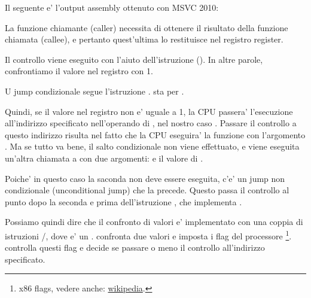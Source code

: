 
Il seguente e' l'output assembly ottenuto con MSVC 2010:



La funzione chiamante (\gls{caller}) \main necessita di ottenere il risultato della funzione chiamata (\gls{callee}), 
e pertanto quest'ultima lo restituisce nel registro \EAX register.

Il controllo viene eseguito con l'aiuto dell'istruzione  (). In altre parole, confrontiamo il valore nel registro \EAX con 1.

U jump condizionale \JNE segue l'istruzione \CMP. \JNE sta per .

Quindi, se il valore nel registro \EAX non e' uguale a 1, la \ac{CPU} passera' l'esecuzione all'indirizzo specificato nell'operando di \JNE, nel nostro caso .
Passare il controllo a questo indirizzo risulta nel fatto che la \ac{CPU} eseguira' la funzione \printf con l'argomento .
Ma se tutto va bene, il salto condizionale non viene effettuato, e viene eseguita un'altra chiamata a \printf con due argomenti:  e il valore di .

Poiche' in questo caso la saconda \printf non deve essere eseguita, c'e' un jump non condizionale (unconditional jump) \JMP che la precede. 
Questo passa il controllo al punto dopo la seconda \printf e prima dell'istruzione , che implementa .

Possiamo quindi dire che il confronto di valori e'  implementato con una coppia di istruzioni \CMP/\Jcc, dove  e' un .
\CMP confronta due valori e imposta i flag del processore \footnote{x86 flags, vedere anche: \href{http://go.yurichev.com/17120}{wikipedia}.}.
\Jcc controlla questi flag e decide se passare o meno il controllo all'indirizzo specificato.

